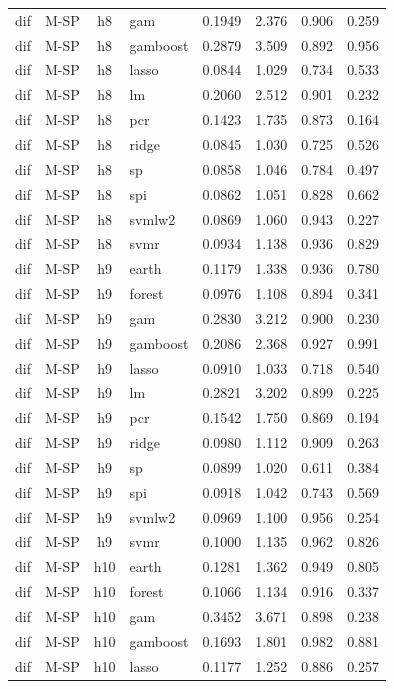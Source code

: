 \begin{ThreePartTable}
\begin{longtable}[t]{llclcccc}
dif & M-SP & h8 & gam & 0.1949 & 2.376 & 0.906 & 0.259\\
dif & M-SP & h8 & gamboost & 0.2879 & 3.509 & 0.892 & 0.956\\
dif & M-SP & h8 & lasso & 0.0844 & 1.029 & 0.734 & 0.533\\
dif & M-SP & h8 & lm & 0.2060 & 2.512 & 0.901 & 0.232\\
dif & M-SP & h8 & pcr & 0.1423 & 1.735 & 0.873 & 0.164\\
dif & M-SP & h8 & ridge & 0.0845 & 1.030 & 0.725 & 0.526\\
dif & M-SP & h8 & sp & 0.0858 & 1.046 & 0.784 & 0.497\\
dif & M-SP & h8 & spi & 0.0862 & 1.051 & 0.828 & 0.662\\
dif & M-SP & h8 & svmlw2 & 0.0869 & 1.060 & 0.943 & 0.227\\
dif & M-SP & h8 & svmr & 0.0934 & 1.138 & 0.936 & 0.829\\
\addlinespace
dif & M-SP & h9 & earth & 0.1179 & 1.338 & 0.936 & 0.780\\
dif & M-SP & h9 & forest & 0.0976 & 1.108 & 0.894 & 0.341\\
dif & M-SP & h9 & gam & 0.2830 & 3.212 & 0.900 & 0.230\\
dif & M-SP & h9 & gamboost & 0.2086 & 2.368 & 0.927 & 0.991\\
dif & M-SP & h9 & lasso & 0.0910 & 1.033 & 0.718 & 0.540\\
dif & M-SP & h9 & lm & 0.2821 & 3.202 & 0.899 & 0.225\\
dif & M-SP & h9 & pcr & 0.1542 & 1.750 & 0.869 & 0.194\\
dif & M-SP & h9 & ridge & 0.0980 & 1.112 & 0.909 & 0.263\\
dif & M-SP & h9 & sp & 0.0899 & 1.020 & 0.611 & 0.384\\
dif & M-SP & h9 & spi & 0.0918 & 1.042 & 0.743 & 0.569\\
dif & M-SP & h9 & svmlw2 & 0.0969 & 1.100 & 0.956 & 0.254\\
dif & M-SP & h9 & svmr & 0.1000 & 1.135 & 0.962 & 0.826\\
\addlinespace
dif & M-SP & h10 & earth & 0.1281 & 1.362 & 0.949 & 0.805\\
dif & M-SP & h10 & forest & 0.1066 & 1.134 & 0.916 & 0.337\\
dif & M-SP & h10 & gam & 0.3452 & 3.671 & 0.898 & 0.238\\
dif & M-SP & h10 & gamboost & 0.1693 & 1.801 & 0.982 & 0.881\\
dif & M-SP & h10 & lasso & 0.1177 & 1.252 & 0.886 & 0.257\\

\end{longtable}
\end{ThreePartTable}
